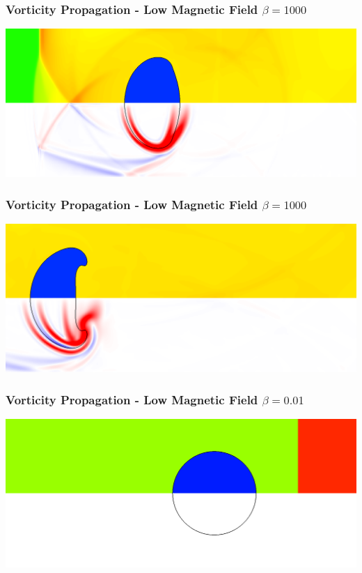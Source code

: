 \documentclass{beamer}
\begin{document}
\begin{frame}
\frametitle{Vorticity Propagation - Low Magnetic Field $\beta = 1000$}
\includegraphics[width=\textwidth]{../images/SRMHDBubbleBeta1000_t59_crop.png}
\end{frame}

\begin{frame}
\frametitle{Vorticity Propagation - Low Magnetic Field $\beta = 1000$}
\includegraphics[width=\textwidth]{../images/SRMHDBubbleBeta1000_t125_crop.png}
\end{frame}

\begin{frame}
\frametitle{Vorticity Propagation - Low Magnetic Field $\beta = 0.01$}
\includegraphics[width=\textwidth]{../images/SRMHDBubbleBeta001_t0_crop.png}
\end{frame}
\end{document}
